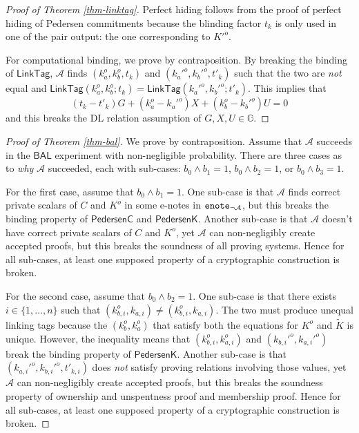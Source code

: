 \documentclass{article}
\begin{document}
\begin{proof}[Proof of Theorem \ref{thm-linktag}]
Perfect hiding follows from the proof of perfect hiding of Pedersen commitments because the blinding factor $t_k$ is only used in one of the pair output: the one corresponding to $K'^o$.

For computational binding, we prove by contraposition. By breaking the binding of $\textsf{LinkTag}$, $\mathcal{A}$ finds $(k_a^o, k_b^o, t_k)$ and $(k_a'^o, k_b'^o, t'_k)$ such that the two are \textit{not} equal and $\textsf{LinkTag}(k_a^o, k_b^o; t_k) = \textsf{LinkTag}(k_a'^o, k_b'^o; t'_k)$. This implies that
$$(t_k - t'_k) G + (k_a^o - k_a'^o) X + (k_b^o - k_b'^o) U = 0$$
and this breaks the DL relation assumption of $G, X, U \in \mathbb{G}$.
\end{proof}
\begin{proof}[Proof of Theorem \ref{thm-bal}]
We prove by contraposition. Assume that $\mathcal{A}$ succeeds in the $\textsf{BAL}$ experiment with non-negligible probability. There are three cases as to \textit{why} $\mathcal{A}$ succeeded, each with sub-cases: $b_0 \wedge b_1 = 1$, $b_0 \wedge b_2 = 1$, or $b_0 \wedge b_3 = 1$.

For the first case, assume that $b_0 \wedge b_1 = 1$. One sub-case is that $\mathcal{A}$ finds correct private scalars of $C$ and $K^o$ in some e-notes in ${\tt enote}_{\neg\mathcal{A}}$, but this breaks the binding property of $\textsf{PedersenC}$ and $\textsf{PedersenK}$. Another sub-case is that $\mathcal{A}$ doesn't have correct private scalars of $C$ and $K^o$, yet $\mathcal{A}$ can non-negligibly create accepted proofs, but this breaks the soundness of all proving systems. Hence for all sub-cases, at least one supposed property of a cryptographic construction is broken.

For the second case, assume that $b_0 \wedge b_2 = 1$. One sub-case is that there exists $i\in\{1,\ldots,n\}$ such that $(k_{b,i}^o, k_{a,i}) \ne (k_{b,i}^o, k_{a,i})$. The two must produce unequal linking tags because the $(k_b^o, k_a^o)$ that satisfy both the equations for $K^o$ and $\tilde{K}$ is unique. However, the inequality means that $(k_{b,i}^o, k_{a,i}^o)$ and $( k_{b,i}'^o, k_{a,i}'^o)$ break the binding property of $\textsf{PedersenK}$. Another sub-case is that $( k_{a,i}'^o, k_{b,i}'^o, t'_{k,i})$ does \textit{not} satisfy proving relations involving those values, yet $\mathcal{A}$ can non-negligibly create accepted proofs, but this breaks the soundness property of ownership and unspentness proof and membership proof. Hence for all sub-cases, at least one supposed property of a cryptographic construction is broken.


\end{proof}
\end{document}
